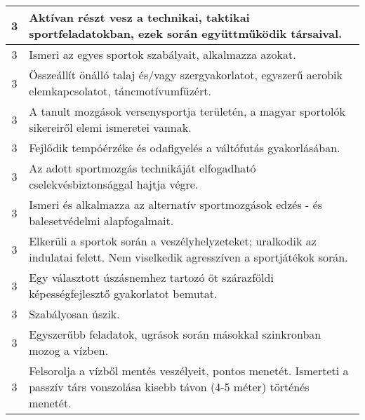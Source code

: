 \begin{longtable}{c | p{} }
                                
                                          3 &  Aktívan részt vesz a technikai, taktikai sportfeladatokban, ezek során együttműködik társaival. \\ \hline
                                          3 &  Ismeri az egyes sportok szabályait, alkalmazza azokat. \\ \hline
                                          3 &  Összeállít önálló talaj és/vagy szergyakorlatot, egyszerű aerobik elemkapcsolatot, táncmotívumfüzért. \\ \hline
                                          3 &  A tanult mozgások versenysportja területén, a magyar sportolók sikereiről elemi ismeretei vannak. \\ \hline
                                          3 &  Fejlődik tempóérzéke és odafigyelés a váltófutás gyakorlásában. \\ \hline
                                          3 &  Az adott sportmozgás technikáját elfogadható cselekvésbiztonsággal hajtja végre. \\ \hline
                                          3 &  Ismeri és alkalmazza az alternatív sportmozgások edzés - és balesetvédelmi alapfogalmait. \\ \hline
                                          3 &  Elkerüli a sportok során a veszélyhelyzeteket; uralkodik az indulatai felett. Nem viselkedik agresszíven a sportjátékok során. \\ \hline
                                          3 &  Egy választott úszásnemhez tartozó öt szárazföldi képességfejlesztő gyakorlatot bemutat. \\ \hline
                                          3 &  Szabályosan úszik. \\ \hline
                                          3 &  Egyszerűbb feladatok, ugrások során másokkal szinkronban mozog a vízben. \\ \hline
                                          3 &  Felsorolja a vízből mentés veszélyeit, pontos menetét. Ismerteti a passzív társ vonszolása kisebb távon (4-5 méter) történés menetét. \\ \hline
                                      

\end{longtable}
